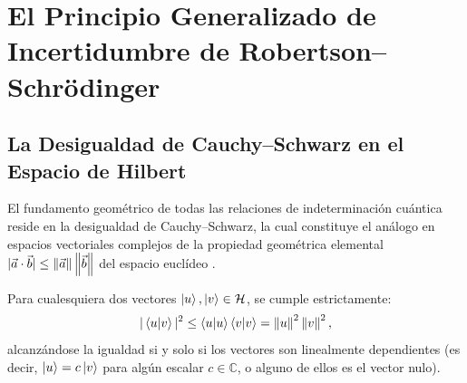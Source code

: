 
\section{El Principio Generalizado de Incertidumbre de Robertson--\texorpdfstring{Schrödinger}{Schrodinger}}
\label{sec:incertidumbre}

\subsection{La Desigualdad de Cauchy--Schwarz en el Espacio de Hilbert}

El fundamento geométrico de todas las relaciones de indeterminación cuántica reside en la desigualdad de Cauchy--Schwarz, la cual constituye el análogo en espacios vectoriales complejos de la propiedad geométrica elemental $|\vec{a}\cdot\vec{b}| \le \left\| \vec{a} \right\|\left\| \vec{b} \right\|$ del espacio euclídeo \cite{zettili}.

\begin{teoremabox}
    Para cualesquiera dos vectores $\left| u \right\rangle, \left| v \right\rangle \in \mathcal{H}$, se cumple estrictamente:
    \begin{equation}
        |\left\langle u \middle| v \right\rangle|^2 \le \left\langle u \middle| u \right\rangle\left\langle v \middle| v \right\rangle = \left\| u \right\|^2 \left\| v \right\|^2,
        \label{eq:cauchy_schwarz}
    \end{equation}
    alcanzándose la igualdad si y solo si los vectores son linealmente dependientes (es decir, $\left| u \right\rangle = c\left| v \right\rangle$ para algún escalar $c \in \mathbb{C}$, o alguno de ellos es el vector nulo).
\end{teoremabox}

